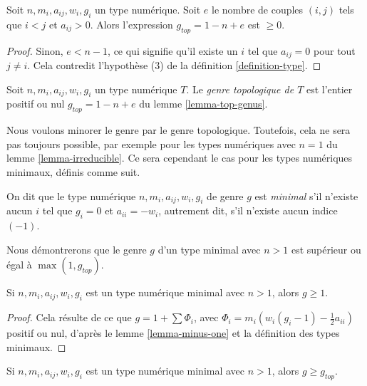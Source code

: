 \begin{lemma}
\label{lemma-top-genus}
Soit $n, m_i, a_{ij}, w_i, g_i$ un type numérique.
Soit $e$ le nombre de couples $(i, j)$ tels que $i < j$ et $a_{ij} > 0$.
Alors l'expression $g_{top} = 1 - n + e$ est $\geq 0$.
\end{lemma}

\begin{proof}
Sinon, $e < n - 1$, ce qui signifie qu'il existe un $i$ tel que
$a_{ij} = 0$ pour tout $j \not = i$. Cela contredit l'hypothèse
(3) de la définition \ref{definition-type}.
\end{proof}

\begin{definition}
\label{definition-top-genus}
Soit $n, m_i, a_{ij}, w_i, g_i$ un type numérique $T$. Le
{\it genre topologique de $T$} est l'entier positif ou nul
$g_{top} = 1 - n + e$ du lemme \ref{lemma-top-genus}.
\end{definition}

\noindent
Nous voulons minorer le genre par le genre topologique. Toutefois, cela
ne sera pas toujours possible, par exemple pour les types numériques
avec $n = 1$ du lemme \ref{lemma-irreducible}. Ce sera cependant
le cas pour les types numériques minimaux, définis comme suit.

\begin{definition}
\label{definition-type-minimal}
On dit que le type numérique $n, m_i, a_{ij}, w_i, g_i$ de genre $g$
est {\it minimal} s'il n'existe aucun $i$
tel que $g_i = 0$ et $a_{ii} = -w_i$, autrement dit, s'il
n'existe aucun indice $(-1)$.
\end{definition}

\noindent
Nous démontrerons que le genre $g$ d'un type minimal avec $n > 1$
est supérieur ou égal à $\max(1, g_{top})$.

\begin{lemma}
\label{lemma-non-irreducible-minimal-type-genus-at-least-one}
Si $n, m_i, a_{ij}, w_i, g_i$ est un type numérique minimal
avec $n > 1$, alors $g \geq 1$.
\end{lemma}

\begin{proof}
Cela résulte de ce que $g = 1 + \sum \Phi_i$, avec
$\Phi_i = m_i(w_i(g_i - 1) - \frac{1}{2} a_{ii})$ positif ou nul,
d'après le lemme \ref{lemma-minus-one} et la définition des types minimaux.
\end{proof}

\begin{lemma}
\label{lemma-genus-nonnegative}
Si $n, m_i, a_{ij}, w_i, g_i$ est un type numérique minimal
avec $n > 1$, alors $g \geq g_{top}$.
\end{lemma}

